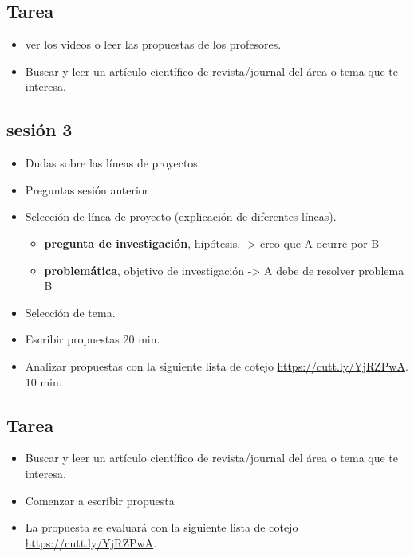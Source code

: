 \documentclass[letterpaper, 10 pt, conference]{ieeeconf}  %
\begin{document}
\subsection*{Tarea} 
\begin{itemize}
	\item ver los videos o leer las propuestas de los profesores.
	\item Buscar y leer un artículo científico de revista/journal del área o tema que te interesa.
\end{itemize}

\subsection{sesión 3}
\begin{itemize}
		\item Dudas sobre las líneas de proyectos.
		\item Preguntas sesión anterior 
		\item Selección de línea de proyecto (explicación de diferentes líneas).
        \begin{itemize}
        	\item \textbf{pregunta de investigación}, hipótesis. -> creo que A ocurre por B
            \item \textbf{problemática}, objetivo de investigación -> A debe de resolver problema B
	    \end{itemize}
		\item Selección de tema.
		\item Escribir propuestas 20 min.
		\item Analizar propuestas con la siguiente lista de cotejo \url{https://cutt.ly/YjRZPwA}. 10 min.
\end{itemize}

\subsection*{Tarea} 
\begin{itemize}
	\item Buscar y leer un artículo científico de revista/journal del área o tema que te interesa.
	\item Comenzar a escribir propuesta
    \item La propuesta se evaluará con la siguiente lista de cotejo \url{https://cutt.ly/YjRZPwA}.
\end{itemize}
\end{document}
